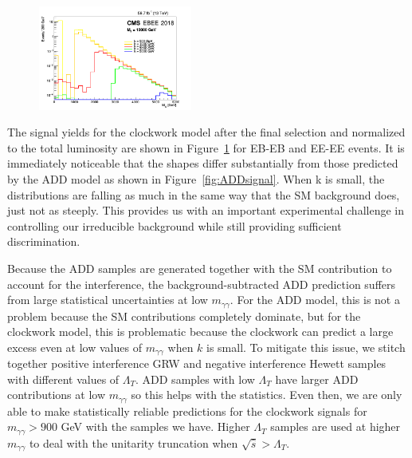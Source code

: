 \begin{figure}[htbp!]
\begin{center}
    \includegraphics[angle=0,width=0.45\textwidth]{fig/2018EBEE.png}
\end{center}
\label{fig:CWSignal}
\end{figure}



The signal yields for the clockwork model after the final selection and normalized to the total luminosity are shown in Figure~\ref{fig:CWSignal} for EB-EB and EE-EE events. It is immediately noticeable that the shapes differ substantially from those predicted by the ADD model as shown in Figure~\ref{fig:ADDsignal}. When k is small, the distributions are falling as much in the same way that the SM background does, just not as steeply. This provides us with an important experimental challenge in controlling our irreducible background while still providing sufficient discrimination. 

Because the ADD samples are generated together with the SM contribution to account for the interference, the background-subtracted ADD prediction suffers from large statistical uncertainties at low $m_{\gamma\gamma}$. For the ADD model, this is not a problem because the SM contributions completely dominate, but for the clockwork model, this is problematic because the clockwork can predict a large excess even at low values of $m_{\gamma\gamma}$ when $k$ is small. To mitigate this issue, we stitch together positive interference GRW and negative interference Hewett samples with different values of $\Lambda_{T}$. ADD samples with low $\Lambda_{T}$ have larger ADD contributions at low $m_{\gamma\gamma}$ so this helps with the statistics. Even then, we are only able to make statistically reliable predictions for the clockwork signals for $m_{\gamma\gamma} > 900$ GeV with the samples we have. Higher $\Lambda_{T}$ samples are used at higher $m_{\gamma\gamma}$ to deal with the unitarity truncation when $\sqrt{\hat{s}} > \Lambda_{T}$. 

